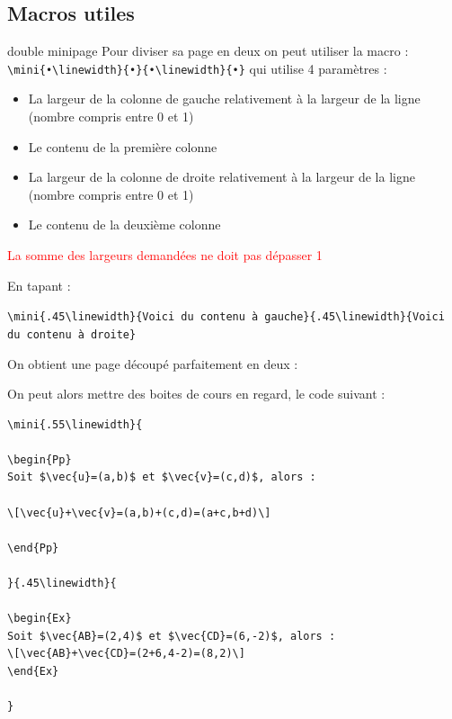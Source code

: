 \begin{pageCours}

\section{Macros utiles}

\begin{DefT}{double minipage}
Pour diviser sa page en deux on peut utiliser la macro :
\verb|\mini{•\linewidth}{•}{•\linewidth}{•}|
qui utilise 4 paramètres :
\begin{itemize}
\item La largeur de la colonne de gauche relativement à la largeur de la ligne (nombre compris entre 0 et 1)
\item Le contenu de la première colonne
\item La largeur de la colonne de droite relativement à la largeur de la ligne (nombre compris entre 0 et 1)
\item Le contenu de la deuxième colonne
\end{itemize}
\textcolor{red}{La somme des largeurs demandées ne doit pas dépasser 1}
\end{DefT}

\begin{Ex}
En tapant : 

\verb|\mini{.45\linewidth}{Voici du contenu à gauche}{.45\linewidth}{Voici du contenu à droite}|

On obtient une page découpé parfaitement en deux :


On peut alors mettre des boites de cours en regard, le code suivant :
\begin{verbatim}
\mini{.55\linewidth}{

\begin{Pp}
Soit $\vec{u}=(a,b)$ et $\vec{v}=(c,d)$, alors :

\[\vec{u}+\vec{v}=(a,b)+(c,d)=(a+c,b+d)\]

\end{Pp}

}{.45\linewidth}{

\begin{Ex}
Soit $\vec{AB}=(2,4)$ et $\vec{CD}=(6,-2)$, alors :
\[\vec{AB}+\vec{CD}=(2+6,4-2)=(8,2)\]
\end{Ex}

}
\end{verbatim}


\end{Ex}
\end{pageCours}
